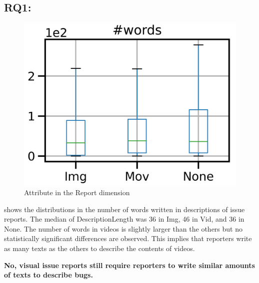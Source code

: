 

\subsection*{RQ1: \RQone{}}
\begin{figure}[t]
    \centering
    \includegraphics[width=0.5\linewidth]{./figures/words.png}
    \caption{Attribute in the Report dimension}
    \label{fig:words}
\end{figure}
 shows the distributions in the number of words 
written in descriptions of issue reports. 
The median of DescriptionLength was 36 in Img, 
46 in Vid, and 36 in None. 
The number of words in videos is slightly larger than 
the others but no statistically significant differences are observed. 
This implies that reporters write as many texts as the others 
to describe the contents of videos. 

\summarybox
{\bf No, visual issue reports still require reporters 
to write similar amounts of texts to describe bugs. 
}

